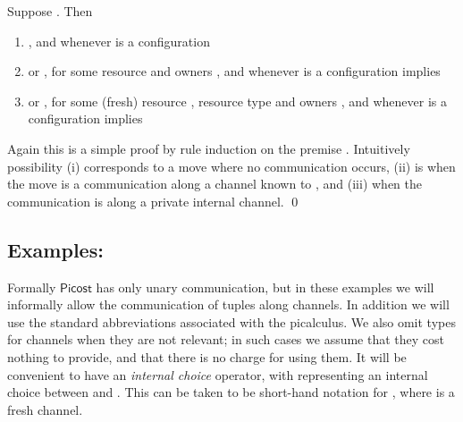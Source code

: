 \documentclass{LMCS}
\newcommand{\pfn}[1]{\mathsf{#1}}  \newcommand{\cfn}[1]{\mathsf{#1}}  \newcommand{\ownfnt}[1]{{\mathsf{#1}}}
\newcommand{\picost}{\ensuremath{\pfn{Picost}}\xspace}
\begin{document}
\begin{prop}\label{prop:red}
  Suppose . Then 
  \begin{enumerate}[\em(i)]
  \item , and  whenever  is a
        configuration
  \item or , for some resource  and owners ,
            and whenever  is a
        configuration  implies  
  \item or , for some (fresh) resource , resource type
  and owners , and whenever  is a
        configuration
        implies 
         
  \end{enumerate}
\end{prop}
\proof
Again this is a simple proof by rule induction on the premise
.  Intuitively possibility (i) corresponds to a move
where no communication occurs, (ii) is when the move is a communication along a channel  known to ,
and (iii) when the communication is along a private internal channel. 
\qed

\subsection{Examples:}\label{sec:examples1}

\newcommand{\Reader}{\pfn{Reader}}
\newcommand{\Store}{\pfn{Store}}
\newcommand{\Library}{\pfn{Library}}
\newcommand{\Sys}{\pfn{Sys}}
\newcommand{\UD}{\pfn{UD}}
\newcommand{\Lib}{\pfn{Lib}}
\newcommand{\GB}{\pfn{Book}}

\newcommand{\local}{\pfn{local}}
\newcommand{\central}{\pfn{central}}

\newcommand{\goLib}{\cfn{goLib}}
\newcommand{\goHome}{\cfn{goHome}}
\newcommand{\reqR}{\cfn{reqR}}
\newcommand{\reqS}{\cfn{reqS}}
\newcommand{\Cname}{\cfn{name}}
\newcommand{\Cbook}{\cfn{book}\xspace}
\newcommand{\Creq}{\cfn{req}}

\newcommand{\Cpublic}{\ownfnt{pub}}
\newcommand{\Clib}{\ownfnt{lib}}
\newcommand{\kate}{\ownfnt{kate}}
\newcommand{\dad}{\ownfnt{dad}}


\newcommand{\news}{\cfn{news}}
\newcommand{\publish}{\cfn{publish}}
\newcommand{\adv}{\cfn{adv}}

Formally \picost has only unary communication, but
in these examples we will informally allow the communication of tuples
along channels. In addition we will use the standard abbreviations
associated with the picalculus.  We also omit types for channels when
they are not relevant; in such cases we assume that they cost nothing
to provide, and that there is no charge for using them.  It will be
convenient to have an \emph{internal choice} operator, with  representing an internal choice between  and .  This can be
taken to be short-hand notation for , where  is a fresh channel.
\end{document}
